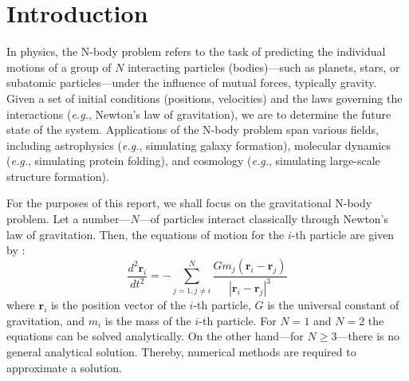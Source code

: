 \documentclass[runningheads]{llncs}
\begin{document}
\section{Introduction}
In physics, the N-body problem refers to the task of predicting the individual motions of a group of $N$ interacting particles (bodies)---such as planets, stars, or subatomic particles---under the influence of mutual forces, typically gravity. Given a set of initial conditions (positions, velocities) and the laws governing the interactions (\emph{e.g.}, Newton's law of gravitation), we are to determine the future state of the system. Applications of the N-body problem span various fields, including astrophysics \cite{10.1093/mnras/staa1915}\cite{BURTSCHER201175} (\emph{e.g.}, simulating galaxy formation), molecular dynamics \cite{MAKSIMENKO2022110962}\cite{geng2013treecode} (\emph{e.g.}, simulating protein folding), and cosmology (\emph{e.g.}, simulating large-scale structure formation). 

For the purposes of this report, we shall focus on the gravitational N-body problem. Let a number---$N$---of particles interact classically through Newton's law of gravitation. Then, the equations of motion for the $i$-th particle are given by \cite{HEGGIE2006575}: 
\begin{equation}
  \frac{d^2\mathbf{r}_i}{dt^2} = -\sum_{j=1,j\neq i}^{N} \frac{G m_j (\mathbf{r}_i - \mathbf{r}_j)}{|\mathbf{r}_i - \mathbf{r}_j|^3}
\end{equation}
where $\mathbf{r}_i$ is the position vector of the $i$-th particle, $G$ is the universal constant of gravitation, and $m_i$ is the mass of the $i$-th particle. For $N=1$ and $N=2$ the equations can be solved analytically. On the other hand---for $N\geq 3$---there is no general analytical solution. Thereby, numerical methods are required to approximate a solution.

\end{document}
